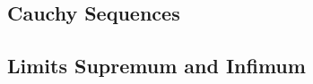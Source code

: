 \documentclass[8pt,landscape]{article}
\begin{document}
\begin{multicols}{3}




    \subsection{Cauchy Sequences}








    \subsection{Limits Supremum and Infimum}





\end{multicols}
\end{document}

